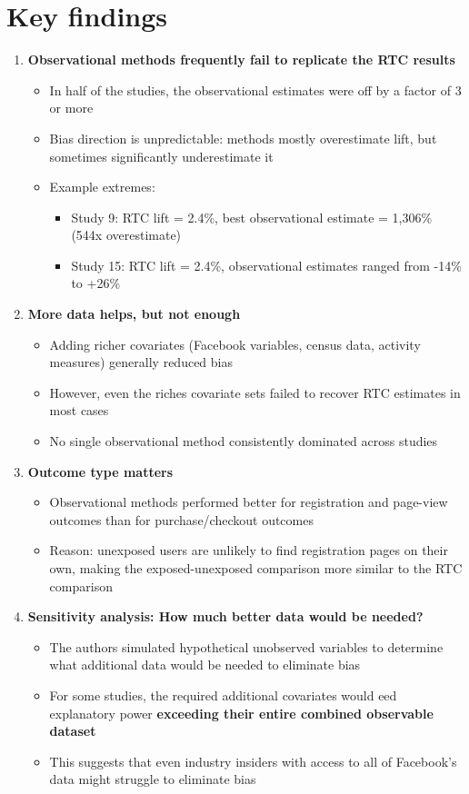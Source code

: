 \documentclass[10pt]{article}
\begin{document}
\section{Key findings}
\begin{enumerate}
    \item \textbf{Observational methods frequently fail to replicate the RTC results}
    \begin{itemize}
        \item In half of the studies, the observational estimates were off by a factor of 3 or more 
        \item Bias direction is unpredictable: methods mostly overestimate lift, but sometimes significantly underestimate it 
        \item Example extremes: 
        \begin{itemize}
            \item Study 9: RTC lift = 2.4\%, best observational estimate = 1,306\% (544x overestimate)
            \item Study 15: RTC lift = 2.4\%, observational estimates ranged from -14\% to +26\%
        \end{itemize}
    \end{itemize}
    \item \textbf{More data helps, but not enough}
    \begin{itemize}
        \item Adding richer covariates (Facebook variables, census data, activity measures) generally reduced bias 
        \item However, even the riches covariate sets failed to recover RTC estimates in most cases 
        \item No single observational method consistently dominated across studies 
    \end{itemize}
    \item \textbf{Outcome type matters}
    \begin{itemize}
        \item Observational methods performed better for registration and page-view outcomes than for purchase/checkout outcomes 
        \item Reason: unexposed users are unlikely to find registration pages on their own, making the exposed-unexposed comparison more similar to the RTC comparison
    \end{itemize}
    \newpage 
    \item \textbf{Sensitivity analysis: How much better data would be needed?}
    \begin{itemize}
        \item The authors simulated hypothetical unobserved variables to determine what additional data would be needed to eliminate bias 
        \item For some studies, the required additional covariates would eed explanatory power \textbf{exceeding their entire combined observable dataset}
        \item This suggests that even industry insiders with access to all of Facebook's data might struggle to eliminate bias 
    \end{itemize}
\end{enumerate}
\end{document}
